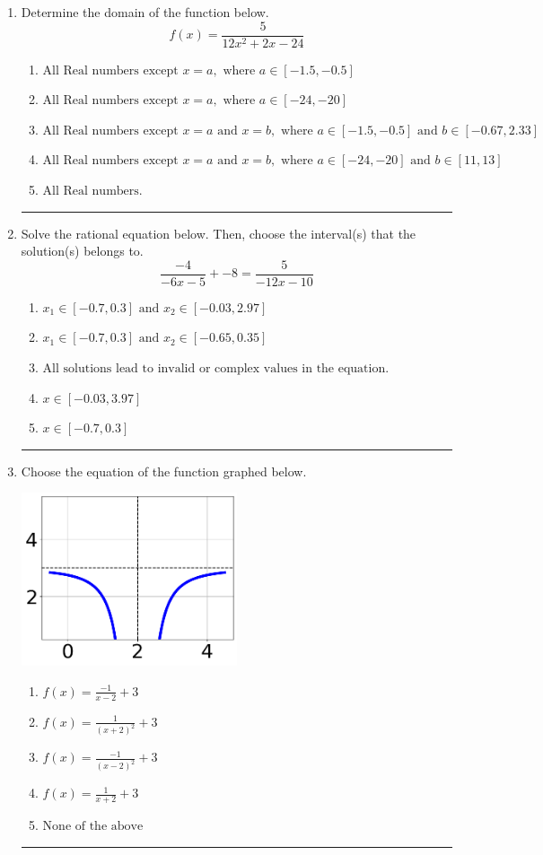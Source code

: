 \documentclass[14pt]{extbook}
\newcommand{\litem}[1]{\item#1\hspace*{-1cm}\rule{\textwidth}{0.4pt}}
\begin{document}
\begin{enumerate}
{\begin{enumerate}[label=\Alph*.]
\end{enumerate} }
\litem{
Determine the domain of the function below.\[ f(x) = \frac{5}{12x^{2} +2 x -24} \]\begin{enumerate}[label=\Alph*.]
\item \( \text{All Real numbers except } x = a, \text{ where } a \in [-1.5, -0.5] \)
\item \( \text{All Real numbers except } x = a, \text{ where } a \in [-24, -20] \)
\item \( \text{All Real numbers except } x = a \text{ and } x = b, \text{ where } a \in [-1.5, -0.5] \text{ and } b \in [-0.67, 2.33] \)
\item \( \text{All Real numbers except } x = a \text{ and } x = b, \text{ where } a \in [-24, -20] \text{ and } b \in [11, 13] \)
\item \( \text{All Real numbers.} \)

\end{enumerate} }
\litem{
Solve the rational equation below. Then, choose the interval(s) that the solution(s) belongs to.\[ \frac{-4}{-6x -5} + -8 = \frac{5}{-12x -10} \]\begin{enumerate}[label=\Alph*.]
\item \( x_1 \in [-0.7, 0.3] \text{ and } x_2 \in [-0.03,2.97] \)
\item \( x_1 \in [-0.7, 0.3] \text{ and } x_2 \in [-0.65,0.35] \)
\item \( \text{All solutions lead to invalid or complex values in the equation.} \)
\item \( x \in [-0.03,3.97] \)
\item \( x \in [-0.7,0.3] \)

\end{enumerate} }
\litem{
Choose the equation of the function graphed below.
\begin{center}
    \includegraphics[width=0.5\textwidth]{../Figures/rationalGraphToEquationB.png}
\end{center}
\begin{enumerate}[label=\Alph*.]
\item \( f(x) = \frac{-1}{x - 2} + 3 \)
\item \( f(x) = \frac{1}{(x + 2)^2} + 3 \)
\item \( f(x) = \frac{-1}{(x - 2)^2} + 3 \)
\item \( f(x) = \frac{1}{x + 2} + 3 \)
\item \( \text{None of the above} \)


\end{enumerate}}
\end{enumerate}
\end{document}
